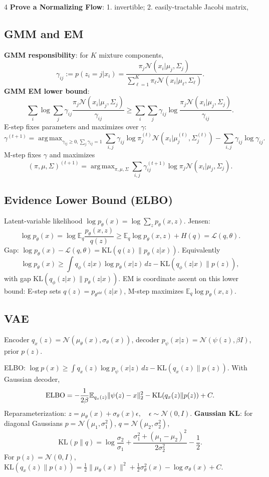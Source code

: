 \documentclass{article}
\newcommand{\key}[1]{\textbf{#1}}
\newcommand{\E}{\mathbb{E}}
\newcommand{\N}{\mathcal{N}}
\newcommand{\KL}{\mathrm{KL}}
\newcommand{\1}{\mathbf 1}
\DeclareMathOperator*{\argmax}{arg\,max}
\begin{document}
\begin{multicols*}{4}
\key{Prove a Normalizing Flow}: 1. invertible; 2. easily-tractable Jacobi matrix, 

\subsection{GMM and EM}
\key{GMM responsibility}: for $K$ mixture components,
\[
\gamma_{ij}:=p(z_i=j|x_i)=
\frac{\pi_j\N(x_i|\mu_j,\Sigma_j)}
{\sum_{\ell=1}^{K}\pi_\ell\N(x_i|\mu_\ell,\Sigma_\ell)}.
\]
\key{GMM EM lower bound}:
\[
\sum_i\log\sum_j\gamma_{ij}\frac{\pi_j\N(x_i|\mu_j,\Sigma_j)}{\gamma_{ij}}
\ge
\sum_i\sum_j\gamma_{ij}\log\frac{\pi_j\N(x_i|\mu_j,\Sigma_j)}{\gamma_{ij}}.
\]
E-step fixes parameters and maximizes over $\gamma$:
\[
\gamma^{(t+1)}=\argmax_{\gamma_{ij}\ge0,\sum_j\gamma_{ij}=1}
\sum_{i,j}\gamma_{ij}\log\pi_j^{(t)}\N(x_i|\mu_j^{(t)},\Sigma_j^{(t)})
-\sum_{i,j}\gamma_{ij}\log\gamma_{ij}.
\]
M-step fixes $\gamma$ and maximizes
\[
(\pi,\mu,\Sigma)^{(t+1)}
=\argmax_{\pi,\mu,\Sigma}\sum_{i,j}\gamma_{ij}^{(t+1)}
\log \pi_j\N(x_i|\mu_j,\Sigma_j).
\]

\subsection{Evidence Lower Bound (ELBO)}
Latent-variable likelihood $\log p_\theta(x)=\log\sum_z p_\theta(x,z)$. Jensen:
\[
\log p_\theta(x)=\log\E_q\frac{p_\theta(x,z)}{q(z)}
\ge \E_q\log p_\theta(x,z)+H(q)=\mathcal L(q,\theta).
\]
Gap:
\(
\log p_\theta(x)-\mathcal L(q,\theta)=\KL(q(z)\|p_\theta(z|x)).
\) 
Equivalently
\[
\log p_\theta(x)\ge
\int q_\phi(z|x)\log p_\theta(x|z)\,dz-\KL(q_\phi(z|x)\|p(z)),
\]
with gap $\KL(q_\phi(z|x)\|p_\theta(z|x))$. EM is coordinate ascent on this lower bound: E-step sets $q(z)=p_{\theta^{old}}(z|x)$, M-step maximizes $\E_q\log p_\theta(x,z)$.

\subsection{VAE}
Encoder $q_x(z)=\N(\mu_\theta(x),\sigma_\theta(x))$, decoder $p_\psi(x|z)=\N(\psi(z),\beta I)$, prior $p(z)$. 

ELBO:
\(
\log p(x)\ge \int q_x(z)\log p_\psi(x|z)\,dz-\KL(q_x(z)\|p(z)).
\)
With Gaussian decoder,
\[
{\rm ELBO}= -\frac1{2\beta}\E_{q_x(z)}\|\psi(z)-x\|_2^2-\KL(q_x(z)\|p(z))+C.
\]
Reparameterization:
\(
z=\mu_\theta(x)+\sigma_\theta(x)\epsilon,\quad \epsilon\sim\N(0,I).
\) 
\key{Gaussian KL}: for diagonal Gaussians $p=\N(\mu_1,\sigma_1^2)$, $q=\N(\mu_2,\sigma_2^2)$,
\[
\KL(p\|q)=\log\frac{\sigma_2}{\sigma_1}+
\frac{\sigma_1^2+(\mu_1-\mu_2)^2}{2\sigma_2^2}-\frac12.
\]
For $p(z)=\N(0,I)$,
\(
\KL(q_x(z)\|p(z))=\frac12\|\mu_\theta(x)\|^2+\frac12\sigma_\theta^2(x)-\log\sigma_\theta(x)+C.
\)


\end{multicols*}
\end{document}
